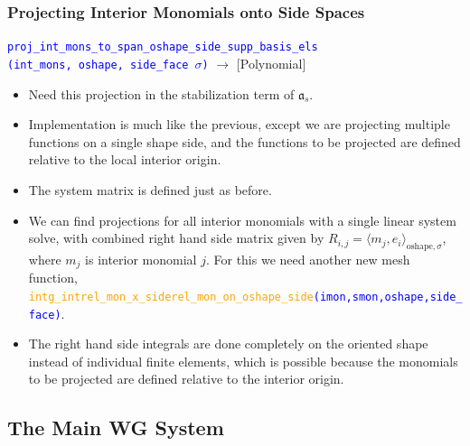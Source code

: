 \documentclass[compress]{beamer}
\begin{document}
\begin{frame}
  \frametitle{Projecting Interior Monomials onto Side Spaces}
  {\small \texttt{\textcolor{blue}{proj\_int\_mons\_to\_span\_oshape\_side\_supp\_basis\_els\\
    \hspace{0.5cm}(int\_mons, oshape, side\_face $\sigma$)}}} $\rightarrow$ [Polynomial]\\
  \pause
  \begin{itemize}[<+->]
    \item Need this projection in the stabilization term of $\mathfrak a_s$.
    \item Implementation is much like the previous, except we are projecting multiple functions on a single
      shape side, and the functions to be projected are defined relative to the local interior origin.
    \item The system matrix is defined just as before.
    \item We can find projections for all interior monomials with a single linear system solve, with combined right hand side
      matrix given by $R_{i,j} = \langle m_j, e_i\rangle_{\text{oshape},\sigma}$, where $m_j$ is interior monomial $j$. For this we
      need another new mesh function,
      \texttt{\scriptsize \textcolor{blue}{\textcolor{orange}{intg\_intrel\_mon\_x\_siderel\_mon\_on\_oshape\_side}(imon,smon,oshape,side\_face)}}.
    \item The right hand side integrals are done completely on the oriented shape instead of individual finite elements, which is
      possible because the monomials to be projected are defined relative to the interior origin.
  \end{itemize} 
\end{frame}

\subsection{The Main WG System}
\end{document}
